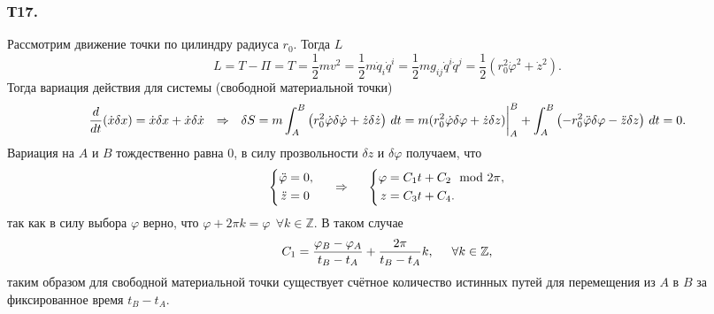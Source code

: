 \subsubsection*{Т17.}

Рассмотрим движение точки по цилиндру радиуса $r_0$. Тогда $L$ 
\begin{equation*}
    L  = T - \Pi = T = \frac{1}{2} m v^2 = \frac{1}{2} m \dot{q}_i \dot{q}^i
    = \frac{1}{2} m g_{ij} \dot{q}^i \dot{q}^j
    = \frac{1}{2} \left(r_0^2 \dot{\varphi}^2 + \dot{z}^2\right)
    .
\end{equation*}
Тогда вариация действия для системы (свободной материальной точки)
\begin{equation*}
    \frac{d }{d t} (\dot{x} \delta x) = \dot{x} \delta x + \dot{x} \delta \dot{x}
    \hspace{0.25cm} \Rightarrow \hspace{0.25cm} 
    \delta S =
    m \int_A^B 
    \left( 
        r_0^2 \dot{\varphi} \delta \dot{\varphi} + \dot{z} \delta \dot{z}
     \right)
    \, d t = 
    m (r_0^2 \dot{\varphi} \delta \varphi + \dot{z} \delta z)\bigg|_A^B
    + 
    \int_A^B 
    \left(
        -r_0^2 \ddot{\varphi} \delta \varphi - \ddot{z} \delta z
    \right) \, d t = 0.
\end{equation*}
Вариация на $A$ и $B$ тождественно равна 0, в силу прозвольности $\delta z$ и $\delta \varphi$ получаем, что
\begin{equation*}
    \left\{\begin{aligned}
        \ddot{\varphi} &= 0, \\
        \ddot{z} &= 0
    \end{aligned}\right.
    \hspace{0.5cm} \Rightarrow \hspace{0.5cm} 
    \left\{\begin{aligned}
        \varphi &= C_1 t + C_2 \mod 2 \pi, \\
        z &= C_3 t + C_4.
    \end{aligned}\right.
\end{equation*}
так как в силу выбора $\varphi$ верно, что $\varphi + 2 \pi k = \varphi \ \  \forall k \in \mathbb{Z}$. В таком случае
\begin{equation*}
    C_1 = \frac{\varphi_B - \varphi_A}{t_B - t_A} + \frac{2\pi}{t_B - t_A} k,
    \hspace{0.5cm} \forall k \in \mathbb{Z},
\end{equation*}
таким образом для свободной материальной точки существует счётное количество истинных путей для перемещения из $A$ в $B$ за фиксированное время $t_B - t_A$.
